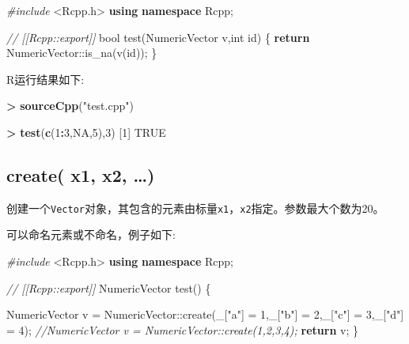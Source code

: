 \documentclass[]{ctexbook}
\newenvironment{Shaded}{\begin{snugshade}}{\end{snugshade}}
\newcommand{\KeywordTok}[1]{\textcolor[rgb]{0.13,0.29,0.53}{\textbf{#1}}}
\newcommand{\DataTypeTok}[1]{\textcolor[rgb]{0.13,0.29,0.53}{#1}}
\newcommand{\DecValTok}[1]{\textcolor[rgb]{0.00,0.00,0.81}{#1}}
\newcommand{\StringTok}[1]{\textcolor[rgb]{0.31,0.60,0.02}{#1}}
\newcommand{\ImportTok}[1]{#1}
\newcommand{\CommentTok}[1]{\textcolor[rgb]{0.56,0.35,0.01}{\textit{#1}}}
\newcommand{\OtherTok}[1]{\textcolor[rgb]{0.56,0.35,0.01}{#1}}
\newcommand{\ControlFlowTok}[1]{\textcolor[rgb]{0.13,0.29,0.53}{\textbf{#1}}}
\newcommand{\OperatorTok}[1]{\textcolor[rgb]{0.81,0.36,0.00}{\textbf{#1}}}
\newcommand{\PreprocessorTok}[1]{\textcolor[rgb]{0.56,0.35,0.01}{\textit{#1}}}
\newcommand{\NormalTok}[1]{#1}
\begin{document}
\begin{Shaded}
\begin{Highlighting}[]
\PreprocessorTok{#include }\ImportTok{<Rcpp.h>}
\KeywordTok{using} \KeywordTok{namespace}\NormalTok{ Rcpp;}

\CommentTok{// [[Rcpp::export]]}
\DataTypeTok{bool}\NormalTok{ test(NumericVector v,}\DataTypeTok{int}\NormalTok{ id) \{}
  \ControlFlowTok{return}\NormalTok{ NumericVector::is_na(v(id));}
\NormalTok{\}}
\end{Highlighting}
\end{Shaded}

R运行结果如下:

\begin{Shaded}
\begin{Highlighting}[]
\OperatorTok{>}\StringTok{ }\KeywordTok{sourceCpp}\NormalTok{(}\StringTok{"test.cpp"}\NormalTok{)}

\OperatorTok{>}\StringTok{   }\KeywordTok{test}\NormalTok{(}\KeywordTok{c}\NormalTok{(}\DecValTok{1}\OperatorTok{:}\DecValTok{3}\NormalTok{,}\OtherTok{NA}\NormalTok{,}\DecValTok{5}\NormalTok{),}\DecValTok{3}\NormalTok{)}
\NormalTok{[}\DecValTok{1}\NormalTok{] }\OtherTok{TRUE}
\end{Highlighting}
\end{Shaded}

\subsection{create( x1, x2, \ldots{})}\label{create}

创建一个\texttt{Vector}对象，其包含的元素由标量\texttt{x1}，\texttt{x2}指定。参数最大个数为20。

可以命名元素或不命名，例子如下:

\begin{Shaded}
\begin{Highlighting}[]
\PreprocessorTok{#include }\ImportTok{<Rcpp.h>}
\KeywordTok{using} \KeywordTok{namespace}\NormalTok{ Rcpp;}

\CommentTok{// [[Rcpp::export]]}
\NormalTok{NumericVector test() \{}
  
\NormalTok{  NumericVector v = NumericVector::create(_[}\StringTok{"a"}\NormalTok{] = }\DecValTok{1}\NormalTok{,_[}\StringTok{"b"}\NormalTok{] = }\DecValTok{2}\NormalTok{,_[}\StringTok{"c"}\NormalTok{] = }\DecValTok{3}\NormalTok{,_[}\StringTok{"d"}\NormalTok{] = }\DecValTok{4}\NormalTok{);}
    \CommentTok{//NumericVector v = NumericVector::create(1,2,3,4);}
  \ControlFlowTok{return}\NormalTok{ v;}
\NormalTok{\}}
\end{Highlighting}
\end{Shaded}
\end{document}
